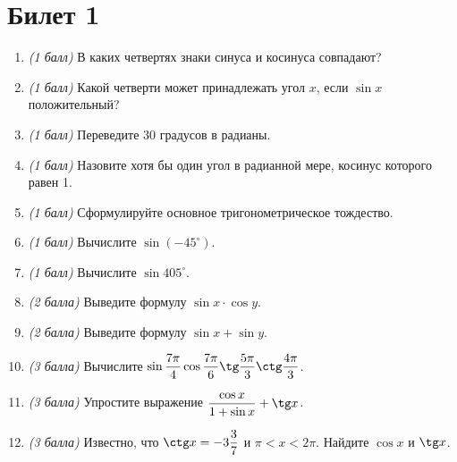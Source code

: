 \documentclass[12pt, a4paper]{article}
\begin{document}
	
	\section*{Билет 1}
	\begin{enumerate}
		\item \textit{(1 балл)} В каких четвертях знаки синуса и косинуса совпадают?
		\item \textit{(1 балл)} Какой четверти может принадлежать угол $x$, если $\sin x$ положительный?
		\item \textit{(1 балл)} Переведите 30 градусов в радианы.
		\item \textit{(1 балл)} Назовите хотя бы один угол в радианной мере, косинус которого равен 1.
		\item \textit{(1 балл)} Сформулируйте основное тригонометрическое тождество.
		\item \textit{(1 балл)} Вычислите $\sin (-45^{\circ})$.
		\item \textit{(1 балл)} Вычислите $\sin 405^{\circ}$.
		\item \textit{(2 балла)} Выведите формулу $\sin x \cdot \cos y$.
		\item \textit{(2 балла)} Выведите формулу $\sin x + \sin y$.
		\item \textit{(3 балла)} Вычислите $\sin \dfrac{7\pi}{4} \cos \dfrac{7\pi}{6} \tg \dfrac{5\pi}{3} \ctg \dfrac{4\pi}{3}$.
		\item \textit{(3 балла)} Упростите выражение $\dfrac{\cos x}{1+\sin x}+\tg x$.
		\item \textit{(3 балла)} Известно, что $\ctg x=-3\dfrac{3}{7}$ и $\pi<x<2\pi$. Найдите $\cos x$ и $\tg x$.
	\end{enumerate}
\end{document}
